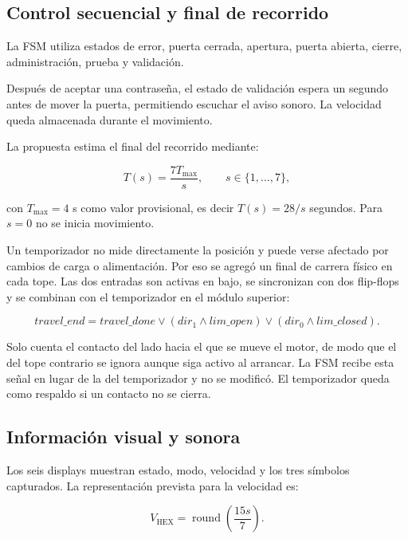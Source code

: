 \documentclass[12pt,letterpaper]{article}
\begin{document}
\subsection{Control secuencial y final de recorrido}

La FSM utiliza estados de error, puerta cerrada,
apertura, puerta abierta, cierre, administración,
prueba y validación.

Después de aceptar una contraseña, el estado de
validación espera un segundo antes de mover la puerta,
permitiendo escuchar el aviso sonoro. La velocidad queda
almacenada durante el movimiento.

La propuesta estima el final del recorrido mediante:

\begin{equation}
T(s)=\frac{7T_{\max}}{s},
\qquad s \in \{1,\ldots,7\},
\end{equation}

con $T_{\max}=4$ s como valor provisional, es decir
$T(s)=28/s$ segundos. Para $s=0$ no se inicia movimiento.

Un temporizador no mide directamente la posición y
puede verse afectado por cambios de carga o alimentación.
Por eso se agregó un final de carrera físico en cada
tope. Las dos entradas son activas en bajo, se
sincronizan con dos flip-flops y se combinan con el
temporizador en el módulo superior:

\begin{equation}
\mathit{travel\_end}=\mathit{travel\_done}
\lor(\mathit{dir}_1\land\mathit{lim\_open})
\lor(\mathit{dir}_0\land\mathit{lim\_closed}).
\end{equation}

Solo cuenta el contacto del lado hacia el que se mueve el
motor, de modo que el del tope contrario se ignora aunque
siga activo al arrancar. La FSM recibe esta señal en lugar
de la del temporizador y no se modificó. El temporizador
queda como respaldo si un contacto no se cierra.

\subsection{Información visual y sonora}

Los seis displays muestran estado, modo, velocidad y
los tres símbolos capturados. La representación prevista
para la velocidad es:

\begin{equation}
V_{\mathrm{HEX}}
=\operatorname{round}\left(\frac{15s}{7}\right).
\end{equation}
\end{document}

